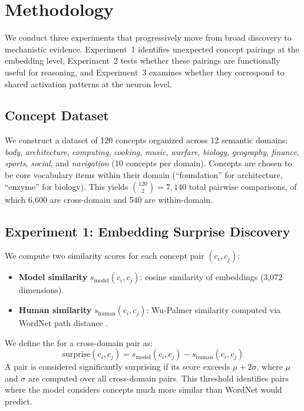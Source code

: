 \section{Methodology}
\label{sec:method}

We conduct three experiments that progressively move from broad discovery to mechanistic evidence.
Experiment~1 identifies unexpected concept pairings at the embedding level, Experiment~2 tests whether these pairings are functionally useful for reasoning, and Experiment~3 examines whether they correspond to shared activation patterns at the neuron level.

\subsection{Concept Dataset}
\label{sec:dataset}

We construct a dataset of 120 concepts organized across 12 semantic domains: \emph{body}, \emph{architecture}, \emph{computing}, \emph{cooking}, \emph{music}, \emph{warfare}, \emph{biology}, \emph{geography}, \emph{finance}, \emph{sports}, \emph{social}, and \emph{navigation} (10 concepts per domain).
Concepts are chosen to be core vocabulary items within their domain (\eg ``foundation'' for architecture, ``enzyme'' for biology).
This yields $\binom{120}{2} = 7{,}140$ total pairwise comparisons, of which 6,600 are cross-domain and 540 are within-domain.

\subsection{Experiment 1: Embedding Surprise Discovery}
\label{sec:exp1}

We compute two similarity scores for each concept pair $(c_i, c_j)$:
\begin{itemize}[leftmargin=*,itemsep=0pt,topsep=0pt]
    \item \textbf{Model similarity} $s_\text{model}(c_i, c_j)$: cosine similarity of \embmodel embeddings (3,072 dimensions).
    \item \textbf{Human similarity} $s_\text{human}(c_i, c_j)$: Wu-Palmer similarity \citep{wu1994verb} computed via WordNet path distance \citep{miller1995wordnet}.
\end{itemize}

We define the \surprisescore for a cross-domain pair as:
\begin{equation}
    \text{surprise}(c_i, c_j) = s_\text{model}(c_i, c_j) - s_\text{human}(c_i, c_j)
    \label{eq:surprise}
\end{equation}
A pair is considered significantly surprising if its score exceeds $\mu + 2\sigma$, where $\mu$ and $\sigma$ are computed over all cross-domain pairs.
This threshold identifies pairs where the model considers concepts much more similar than WordNet would predict.

